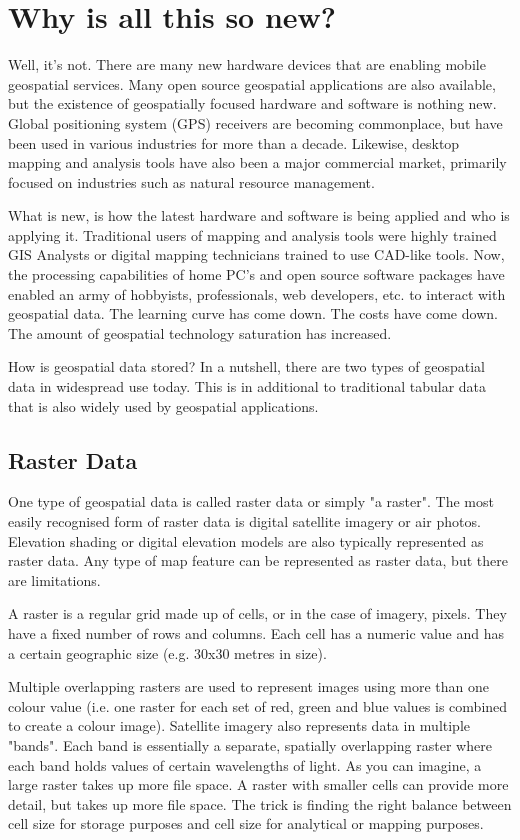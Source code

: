 \section{Why is all this so new?}
Well, it's not. There are many new hardware devices that are enabling mobile geospatial services. Many open source geospatial applications are also available, but the existence of geospatially focused hardware and software is nothing new. Global positioning system (GPS) receivers are becoming commonplace, but have been used in various industries for more than a decade. Likewise, desktop mapping and analysis tools have also been a major commercial market, primarily focused on industries such as natural resource management.

What is new, is how the latest hardware and software is being applied and who is applying it. Traditional users of mapping and analysis tools were highly trained GIS Analysts or digital mapping technicians trained to use CAD-like tools. Now, the processing capabilities of home PC's and open source software packages have enabled an army of hobbyists, professionals, web developers, etc. to interact with geospatial data. The learning curve has come down. The costs have come down. The amount of geospatial technology saturation has increased.

How is geospatial data stored?
In a nutshell, there are two types of geospatial data in widespread use today. This is in additional to traditional tabular data that is also widely used by geospatial applications.

\subsection{Raster Data}
One type of geospatial data is called raster data or simply "a raster". The most easily recognised form of raster data is digital satellite imagery or air photos. Elevation shading or digital elevation models are also typically represented as raster data. Any type of map feature can be represented as raster data, but there are limitations.

A raster is a regular grid made up of cells, or in the case of imagery, pixels. They have a fixed number of rows and columns. Each cell has a numeric value and has a certain geographic size (e.g. 30x30 metres in size).

Multiple overlapping rasters are used to represent images using more than one colour value (i.e. one raster for each set of red, green and blue values is combined to create a colour image). Satellite imagery also represents data in multiple "bands". Each band is essentially a separate, spatially overlapping raster where each band holds values of certain wavelengths of light. As you can imagine, a large raster takes up more file space. A raster with smaller cells can provide more detail, but takes up more file space. The trick is finding the right balance between cell size for storage purposes and cell size for analytical or mapping purposes.

